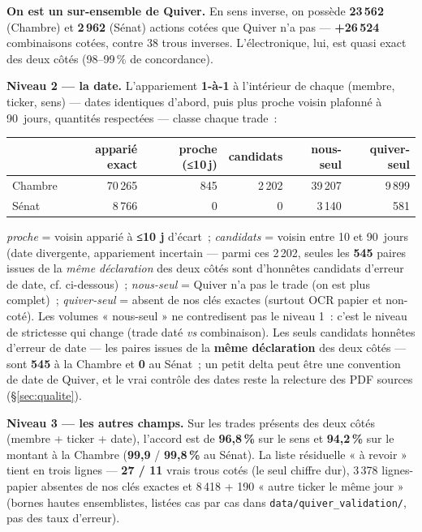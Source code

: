 \documentclass[11pt,a4paper]{article}
\newcommand{\co}[1]{\texttt{\small #1}}
\begin{document}
\textbf{On est un sur-ensemble de Quiver.} En sens inverse, on possède \textbf{23\,562} (Chambre) et
\textbf{2\,962} (Sénat) actions cotées que Quiver n'a pas — \textbf{+26\,524} combinaisons cotées, contre
38 trous inverses. L'électronique, lui, est quasi exact des deux côtés (98--99\,\% de concordance).

\textbf{Niveau 2 — la date.} L'appariement \textbf{1-à-1} à l'intérieur de chaque (membre, ticker, sens) —
dates identiques d'abord, puis plus proche voisin plafonné à 90~jours, quantités respectées — classe chaque
trade~:
\begin{center}\small
\begin{tabular}{l rrrrr}
\toprule
& \bfseries apparié exact & \bfseries proche (≤10\,j) & \bfseries candidats & \bfseries nous-seul & \bfseries quiver-seul\\
\midrule
Chambre & 70\,265 & 845 & 2\,202 & 39\,207 & 9\,899 \\
Sénat & 8\,766 & 0 & 0 & 3\,140 & 581 \\
\bottomrule
\end{tabular}
\end{center}
{\footnotesize \emph{proche} = voisin apparié à \textbf{≤10 j} d'écart~; \emph{candidats} = voisin entre 10 et 90~jours (date divergente, appariement incertain — parmi ces 2\,202, seules les \textbf{545} paires issues de la \emph{même déclaration} des deux côtés sont d'honnêtes candidats d'erreur de date, cf. ci-dessous)~; \emph{nous-seul} = Quiver n'a pas le trade (on est plus complet)~; \emph{quiver-seul} = absent de nos clés exactes (surtout OCR papier et non-coté). Les volumes « nous-seul » ne contredisent pas le niveau 1~: c'est le niveau de strictesse qui change (trade daté \emph{vs} combinaison).}
Les seuls candidats honnêtes d'erreur de date — les paires issues de la \textbf{même déclaration} des deux
côtés — sont \textbf{545} à la Chambre et \textbf{0} au Sénat~; un petit delta peut être une convention de
date de Quiver, et le vrai contrôle des dates reste la relecture des PDF sources (\S{}\ref{sec:qualite}).

\textbf{Niveau 3 — les autres champs.} Sur les trades présents des deux côtés (membre + ticker + date),
l'accord est de \textbf{96,8\,\%} sur le sens et \textbf{94,2\,\%} sur le montant à la Chambre
(\textbf{99,9} / \textbf{99,8\,\%} au Sénat). La liste résiduelle « à revoir » tient en trois lignes —
\textbf{27 / 11} vrais trous cotés (le seul chiffre dur), 3\,378 lignes-papier absentes de nos clés exactes
et 8\,418 + 190 « autre ticker le même jour » (bornes hautes ensemblistes, listées cas par cas dans
\co{data/quiver_validation/}, pas des taux d'erreur).
\end{document}
